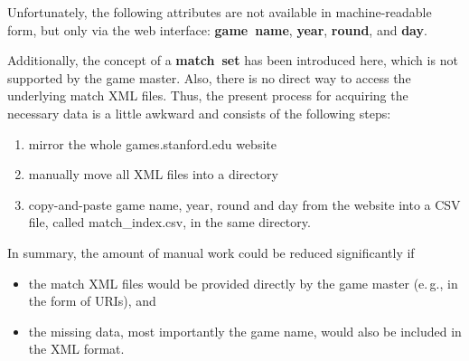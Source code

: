 \documentclass[a4paper,10pt]{article}
\begin{document}
Unfortunately, the following attributes are not available in machine-readable
form, but only via the web interface:
\textbf{game~name}, \textbf{year}, \textbf{round}, and \textbf{day}.

Additionally, the concept of a \textbf{match~set} has been introduced here,
which is not supported by the game master. Also, there is no direct way to
access the underlying match XML files. Thus, the present process for acquiring
the necessary data is a little awkward and consists of the following steps:
\begin{enumerate}
 \item mirror the whole games.stanford.edu website
 \item manually move all XML files into a directory
 \item copy-and-paste game name, year, round and day from the website into a CSV
file, called match\_index.csv, in the same directory.
\end{enumerate}
In summary, the amount of manual work could be reduced significantly if 
\begin{itemize}
	\item the match XML files would be provided directly by the game master
(e.\,g., in the form of URIs), and
	\item the missing data, most importantly the game name, would also be included
in the XML format.
\end{itemize}
\end{document}
